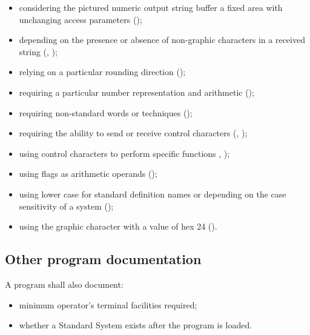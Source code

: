 \begin{itemize}

\item considering the pictured numeric output string buffer a fixed
	area with unchanging access parameters
	();

\item depending on the presence or absence of non-graphic characters
	in a received string (,
	);

\item relying on a particular rounding direction
	();

\item requiring a particular number representation and arithmetic
	();

\item requiring non-standard words or techniques
	();

\item requiring the ability to send or receive control characters
	(,
	);

\item using control characters to perform specific functions
	, );

\item using flags as arithmetic operands
	();

\item using lower case for standard definition names or depending
	on the case sensitivity of a system
	();

\item using the graphic character with a value of hex 24
	().

\end{itemize}

\subsection{Other program documentation} %

A program shall also document:

\begin{itemize}

\item minimum operator's terminal facilities required;

\item whether a Standard System exists after the program is loaded.

\end{itemize}
